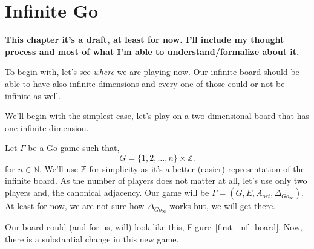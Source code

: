 {\centering
	\chapter{Infinite Go}\label{infgo}}
\thispagestyle{empty}
\noindent
{\large\textbf{This chapter it's a draft, at least for now. I'll include my thought process and most of what I'm able to understand/formalize about it.}}
\vspace{20pt}

To begin with, let's see \textit{where} we are playing now. Our infinite board should be able to have also infinite dimensions and every one of those could or not be infinite as well.

We'll begin with the simplest case, let's play on a two dimensional board that has one infinite dimension.

Let $\Gamma$ be a Go game such that,
$$G=\{1,2,\dots,n\}\times \mathbb{Z}.$$
for $n\in \mathbb{N}$. We'll use $\mathbb{Z}$ for simplicity as it's a better (easier) representation of the infinite board.
As the number of players does not matter at all, let's use only two players and, the canonical adjacency.
Our game will be $\Gamma=(G,E,A_{ort},\Delta_{Go_{\infty}})$.
At least for now, we are not sure how $\Delta_{Go_{\infty}}$ works but, we will get there.

Our board could (and for us, will) look like this, Figure~\ref{first_inf_board}. Now, there is a substantial change in this new game.

